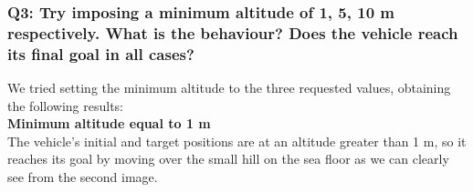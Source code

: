 \documentclass{article}
\begin{document}
\subsubsection{Q3: Try imposing a minimum altitude of 1, 5, 10 m respectively. What is the behaviour? Does the vehicle reach its final goal in all cases?}
We tried setting the minimum altitude to the three requested values, obtaining the following results: \\

{\large \textbf{Minimum altitude equal to 1 m}} \\
The vehicle's initial and target positions are at an altitude greater than 1 m, so it reaches its goal by moving over the small hill on the sea floor as we can clearly see from the second image.

\begin{figure}[H]
	\centering
	\hspace{10mm}
	\label{fig:ex1.2.3_case1m_ab}
\end{figure}
\end{document}
